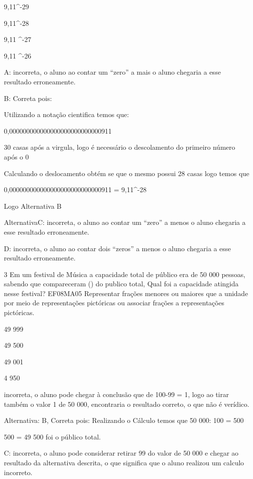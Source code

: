 \item 9,11^-29
\item 9,11^-28
\item 9,11 ^-27
\item 9,11 ^-26

A: incorreta, o aluno ao contar um ``zero'' a mais o aluno chegaria a
esse resultado erroneamente.

B: Correta pois:

Utilizando a notação cientifica temos que:

0,000000000000000000000000000911

30 casas após a virgula, logo é necessário o descolamento do primeiro
número após o 0

Calculando o deslocamento obtém se que o mesmo possui 28 casas logo
temos que

0,000000000000000000000000000911 = 9,11^-28

Logo Alternativa B

AlternativaC: incorreta, o aluno ao contar um ``zero'' a menos o aluno
chegaria a esse resultado erroneamente.

D: incorreta, o aluno ao contar dois ``zeros'' a menos o aluno chegaria
a esse resultado erroneamente.

\num{3} Em um festival de Música a capacidade total de público era de 50 000
pessoas, sabendo que compareceram () do publico total,
Qual foi a capacidade atingida nesse festival? EF08MA05 Representar
frações menores ou maiores que a unidade por meio de representações
pictóricas ou associar frações a representações pictóricas.

\item 49 999
\item 49 500
\item 49 001
\item 4 950

incorreta, o aluno pode chegar à conclusão que de 100-99 = 1, logo ao
tirar também o valor 1 de 50 000, encontraria o resultado correto, o que
não é verídico.

Alternativa: B, Correta pois: Realizando o Cálculo temos que 50 000: 100
= 500

500 = 49 500 foi o público total.

C: incorreta, o aluno pode considerar retirar 99 do valor de 50 000 e
chegar ao resultado da alternativa descrita, o que significa que o aluno
realizou um calculo incorreto.

